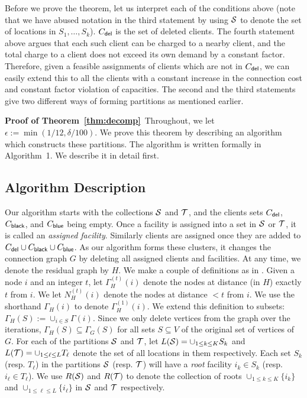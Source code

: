 Before we prove the theorem, let us interpret each of the conditions above (note that we have abused notation in the third statement by using ${\cal S}$ to
denote the set of locations in $S_1, \ldots, S_k$). $C_{\mathsf{del}}$ is the set of deleted clients. The fourth statement above argues that each such  client can be charged to a nearby client, and  the total charge to a client does not exceed its own demand by a constant factor. Therefore, given a feasible assignments of clients which are not in $C_{\mathsf{del}}$, we can easily extend this to all the clients with a constant increase in the connection cost and constant factor violation of capacities. The second and the third statements give two different ways of forming partitions as mentioned earlier. 

\vspace*{0.1 in}
\noindent
{\bf Proof of Theorem~\ref{thm:decomp}}\ 
Throughout, we let $\epsilon := \min(1/12,\delta/100)$.
We prove this theorem by describing an algorithm which constructs these partitions.
The algorithm is written formally in Algorithm~1. We describe it in detail first.

\subsection{Algorithm Description}
Our algorithm starts with the collections ${\cal S}$ and ${\cal T}$, and the clients sets $C_{\mathsf{del}}$, $C_{\mathsf{black}}$, and $C_{\mathsf{blue}}$ being empty. Once a facility is assigned into a set in ${\cal S}$ or ${\cal T}$, it is called an \emph{assigned facility}. Similarly clients are assigned once they are added to $C_{\mathsf{del}} \cup C_{\mathsf{black}} \cup C_{\mathsf{blue}}$.
As our algorithm forms these clusters, it changes the connection graph $G$ by deleting all assigned clients and facilities. At any time, we denote the residual graph by $H$. 
We make a couple of definitions as in \Cref{sec:regiongrowing}. Given a node $i$ and an integer $t$, let $\Gamma^{(t)}_H(i)$ denote the nodes at distance (in $H$) exactly $t$ from $i$. We let $N^{(t)}_H(i)$ denote the nodes at distance $< t$ from $i$.
We use the shorthand $\Gamma_H(i)$ to denote $\Gamma^{(1)}_H(i)$. We extend this definition to subsets: $\Gamma_H(S) := \cup_{i\in S}\Gamma(i)$. 
Since we only delete vertices from the graph over the iterations, $\Gamma_H(S) \subseteq \Gamma_G(S)$ for all sets $S \subseteq V$ of the original set of vertices of $G$. 
For each of the partitions ${\cal S}$ and ${\cal T}$, let $L({\cal S}) = \cup_{1\leq k \leq K} S_k$ and $L({\cal T}) = \cup_{1 \leq \ell \leq L} T_\ell$ denote the set of all locations in them respectively.
Each set $S_k$ (resp. $T_\ell$) in the partitions ${\cal S}$ (resp. ${\cal T}$) will have a {\em root} facility $i_k \in S_k$ (resp. $i_\ell \in T_\ell$). We use $R({\cal S})$ and $R({\cal T})$ to denote the collection of roots $\cup_{1 \leq k \leq K} \{i_k\}$ and $\cup_{1 \leq \ell \leq L} \{i_\ell\}$ in ${\cal S}$ and ${\cal T}$ respectively. \smallskip




